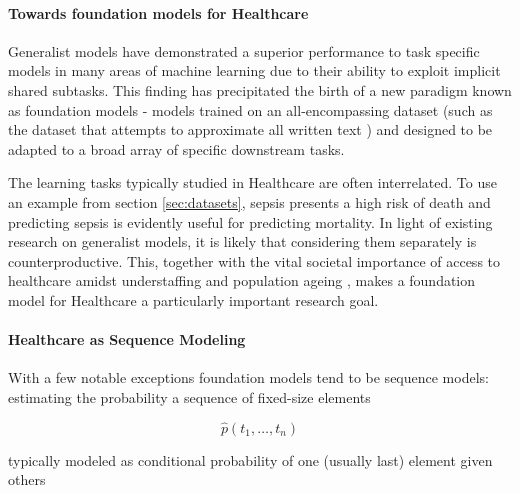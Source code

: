 \paragraph{Towards foundation models for Healthcare}

Generalist models have demonstrated a superior performance to task specific models in many areas of machine learning \cite{reedGeneralistAgent2022} due to their ability to exploit implicit shared subtasks. 
This finding has precipitated the birth of a new paradigm known as foundation models \cite{zhouComprehensiveSurveyPretrained2023} - models trained on an all-encompassing dataset (such as the dataset that attempts to approximate all written text \cite{chelbaOneBillionWord2013}) and designed to be adapted to a broad array of specific downstream tasks.

The learning tasks typically studied in Healthcare are often interrelated. 
To use an example from section \ref{sec:datasets}, sepsis presents a high risk of death \cite{schlichtingRecognizingManagingSevere2007} and predicting sepsis is evidently useful for predicting mortality.
In light of existing research on generalist models, it is likely that considering them separately is counterproductive.
This, together with the vital societal importance of access to healthcare amidst understaffing \cite{ashleyy.metcalfHospitalUnitUnderstaffing2016, hudsonUnderstaffing2015, mercerMessageEditorinChief2008, munnUnderstaffingWardsCompromising2017, r.stanleyUnderstaffedOverwhelmed2010, SurveyShowsHidden1993, thelancetHealthcareSystemStaffing2018, UnderstaffingSignificantIssue2012} and population ageing \cite{2012health, Aslam2021Ageing, L1991aging, Lloyd2012Population, Mahishale2015Ageing, Mann2004aging, Sammy2019global, Suzman2015Health}, makes a foundation model for Healthcare a particularly important research goal.

\paragraph{Healthcare as Sequence Modeling}
\label{sec:sequencemodel}

With a few notable exceptions foundation models tend to be sequence models: estimating the probability a sequence of fixed-size elements

\begin{equation}
    \hat{p}(t_1, \dots, t_n)
\end{equation}

typically modeled as conditional probability of one (usually last) element given others

